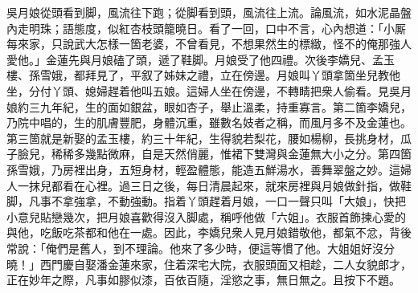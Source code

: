 吳月娘從頭看到脚，風流往下跑；從脚看到頭，風流往上流。{}論風流，如水泥晶盤內走明珠；{}語態度，似紅杏枝頭籠曉日。看了一回，口中不言，心內想道：「小厮每來家，只說武大怎樣一箇老婆，不曾看見，不想果然生的標緻，怪不的俺那強人愛他。」{}金蓮先與月娘磕了頭，遞了鞋脚。月娘受了他四禮。次後李嬌兒、孟玉樓、孫雪娥，都拜見了，平叙了姊妹之禮，立在傍邊。月娘叫丫頭拿箇坐兒教他坐，分付丫頭、媳婦趕着他叫五娘。這婦人坐在傍邊，不轉睛把衆人偷看。見吳月娘約三九年紀，生的面如銀盆，眼如杏子，舉止溫柔，持重寡言。第二箇李嬌兒，乃院中唱的，生的肌膚豐肥，身體沉重，雖數名妓者之稱，而風月多不及金蓮也。第三箇就是新娶的孟玉樓，約三十年紀，生得貌若梨花，腰如楊柳，長挑身材，瓜子臉兒，稀稀多幾點微麻，自是天然俏麗，惟裙下雙灣與金蓮無大小之分。第四箇孫雪娥，乃房裡出身，五短身材，輕盈體態，能造五鮮湯水，善舞翠盤之妙。這婦人一抹兒都看在心裡。過三日之後，每日清晨起來，就來房裡與月娘做針指，做鞋脚，凡事不拿強拿，不動強動。{}指着丫頭趕着月娘，一口一聲只叫「大娘」，快把小意兒貼戀幾次，把月娘喜歡得沒入脚處，稱呼他做「六姐」。衣服首飾揀心愛的與他，吃飯吃茶都和他在一處。{}因此，李嬌兒衆人見月娘錯敬他，都氣不忿，背後常說：「俺們是舊人，到不理論。他來了多少時，便這等慣了他。大姐姐好沒分曉！」西門慶自娶潘金蓮來家，住着深宅大院，衣服頭面又相趁，二人女貌郎才，正在妙年之際，凡事如膠似漆，百依百隨，淫慾之事，無日無之。且按下不題。

